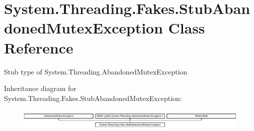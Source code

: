 \hypertarget{class_system_1_1_threading_1_1_fakes_1_1_stub_abandoned_mutex_exception}{\section{System.\-Threading.\-Fakes.\-Stub\-Abandoned\-Mutex\-Exception Class Reference}
\label{class_system_1_1_threading_1_1_fakes_1_1_stub_abandoned_mutex_exception}
}


Stub type of System.\-Threading.\-Abandoned\-Mutex\-Exception 


Inheritance diagram for System.\-Threading.\-Fakes.\-Stub\-Abandoned\-Mutex\-Exception\-:\begin{figure}[H]
\begin{center}
\leavevmode
\includegraphics[height=1.011743cm]{class_system_1_1_threading_1_1_fakes_1_1_stub_abandoned_mutex_exception}
\end{center}
\end{figure}
